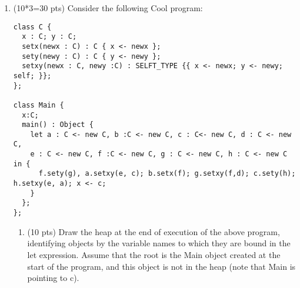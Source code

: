 \documentclass[10pt]{article}
\begin{document}
\begin{enumerate}
\begin{enumerate}
\begin{verbatim}
        \end{verbatim}

    \begin{center}\end{center}
\end{enumerate} 


\item (10*3=30 pts) Consider the following Cool program:

\begin{verbatim}
class C {
  x : C; y : C;
  setx(newx : C) : C { x <- newx };
  sety(newy : C) : C { y <- newy };
  setxy(newx : C, newy :C) : SELFT_TYPE {{ x <- newx; y <- newy; self; }};
};

class Main {
  x:C;
  main() : Object {
    let a : C <- new C, b :C <- new C, c : C<- new C, d : C <- new C,
    e : C <- new C, f :C <- new C, g : C <- new C, h : C <- new C in {
      f.sety(g), a.setxy(e, c); b.setx(f); g.setxy(f,d); c.sety(h); h.setxy(e, a); x <- c;
    }
  };
};
\end{verbatim}
\begin{enumerate}
  \item (10 pts) Draw the heap at the end of execution of the above program, identifying objects by the variable names to which they are bound in the let expression. Assume that the root is the Main object created at the start of the program, and this object is not in the heap (note that Main is pointing to c).



\end{enumerate}
\end{enumerate}
\end{document}
